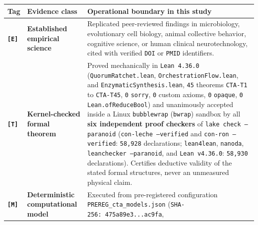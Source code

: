 \documentclass[10pt,letterpaper]{article}
\begin{document}
{\footnotesize\setlength{\tabcolsep}{3.8pt}\renewcommand{\arraystretch}{1.15}
\begin{longtable}[]{@{}
  >{\raggedright\arraybackslash}p{}
  >{\raggedright\arraybackslash}p{}
  >{\raggedright\arraybackslash}p{}@{}}
\toprule\noalign{}
\begin{minipage}[b]{\linewidth}\raggedright
\textbf{Tag}
\end{minipage} & \begin{minipage}[b]{\linewidth}\raggedright
\textbf{Evidence class}
\end{minipage} & \begin{minipage}[b]{\linewidth}\raggedright
\textbf{Operational boundary in this study}
\end{minipage} \\
\midrule\noalign{}
\endhead
\bottomrule\noalign{}
\endlastfoot
\textbf{\texttt{{[}E{]}}} & \textbf{Established empirical science} &
Replicated peer-reviewed findings in microbiology, evolutionary cell
biology, animal collective behavior, cognitive science, or human
clinical neurotechnology, cited with verified \texttt{DOI} or
\texttt{PMID} identifiers. \\
\textbf{\texttt{{[}T{]}}} & \textbf{Kernel-checked formal theorem} &
Proved mechanically in \texttt{Lean\ 4.\allowbreak{}36.\allowbreak{}0}
(\texttt{QuorumRatchet.\allowbreak{}lean}, \texttt{OrchestrationFlow.\allowbreak{}lean}, and
\texttt{EnzymaticSynthesis.\allowbreak{}lean}, \texttt{45} theorems \texttt{CTA-T1}
to \texttt{CTA-T45}, \texttt{0} \texttt{sorry}, \texttt{0} custom
axioms, \texttt{0} \texttt{opaque}, \texttt{0}
\texttt{Lean.\allowbreak{}ofReduceBool}) and unanimously accepted inside a Linux
\texttt{bubblewrap} (\texttt{bwrap}) sandbox by all \textbf{six
independent proof checkers} of \texttt{lake\ check\ --paranoid}
(\texttt{con-leche\ --verified} and \texttt{con-ron\ --verified}:
\texttt{58,928} declarations; \texttt{lean4lean}, \texttt{nanoda},
\texttt{leanchecker\ --paranoid}, and \texttt{Lean\ v4.36.0}:
\texttt{58,930} declarations). Certifies deductive validity of the
stated formal structures, never an unmeasured physical claim. \\
\textbf{\texttt{{[}M{]}}} & \textbf{Deterministic computational model} &
Executed from pre-registered configuration
\texttt{PREREG\_\allowbreak{}cta\_\allowbreak{}models.\allowbreak{}json} (\texttt{SHA-\allowbreak{}256:\ 475a89e3.\allowbreak{}.\allowbreak{}.\allowbreak{}ac9fa},

\end{longtable}}
\end{document}
